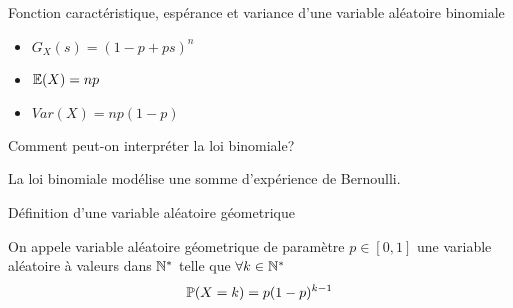\begin{note}
  \begin{field}
    Fonction caractéristique, espérance et variance d'une variable
    aléatoire binomiale
  \end{field}
  \begin{field}
    \begin{itemize}
    \item $G_X(s) = (1-p+ps)^n$
    \item $\mathbb{E}(X) = np$
    \item $Var(X) = np(1-p)$
    \end{itemize}
  \end{field}
  \begin{field}

  \end{field}
\end{note}

\begin{note}
  \begin{field}
    Comment peut-on interpréter la loi binomiale?
  \end{field}
  \begin{field}
    La loi binomiale modélise une somme d'expérience de Bernoulli.
  \end{field}
  \begin{field}

  \end{field}
\end{note}

\begin{note}
  \begin{field}
    Définition d'une variable aléatoire géometrique
  \end{field}
  \begin{field}
    On appele variable aléatoire géometrique de paramètre $p
    \in [0,1]$ une variable aléatoire à valeurs dans $\mathbb{N}^*$ telle
    que $\forall k \in \mathbb{N}^*$
    $$\mathbb{P}(X=k)=p(1-p)^{k-1}$$
  \end{field}
  \begin{field}

  \end{field}
  \xplain{}                               %
  \xplain{}                               %
\end{note}

